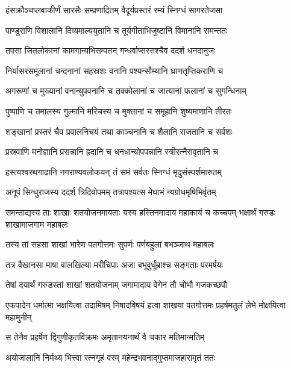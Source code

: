 \twolineshloka
{हंसक्रौञ्चप्लवाकीर्णं सारसैः सम्प्रणादितम्}
{वैदूर्यप्रस्तरं रम्यं स्निग्धं सागरतेजसा} %

\twolineshloka
{पाण्डुराणि विशालानि दिव्यमाल्ययुतानि च}
{तूर्यगीताभिजुष्टानि विमानानि समन्ततः} %

\twolineshloka
{तपसा जितलोकानां कामगान्यभिसम्पतन्}
{गन्धर्वाप्सरसश्चैव ददर्श धनदानुजः} %

\twolineshloka
{निर्यासरसमूलानां चन्दनानां सहस्रशः}
{वनानि पश्यन्सौम्यानि घ्राणतृप्तिकराणि च} %

\twolineshloka
{अगरूणां च मुख्यानां वनान्युपवनानि च}
{तक्कोलानां च जात्यानां फलानां च सुगन्धिनाम्} %

\twolineshloka
{पुष्पाणि च तमालस्य गुल्मानि मरिचस्य च}
{मुक्तानां च समूहानि शुष्यमाणानि तीरतः} %

\twolineshloka
{शङ्खानां प्रस्तरं चैव प्रवालनिचयं तथा}
{काञ्चनानि च शैलानि राजतानि च सर्वशः} %

\twolineshloka
{प्रस्रवाणि मनोज्ञानि प्रसन्नानि ह्रदानि च}
{धनधान्योपपन्नानि स्त्रीरत्नैरावृतानि च} %

\twolineshloka
{हस्त्यश्वरथगाढानि नगराण्यवलोकयन्}
{तं समं सर्वतः स्निग्धं मृदुसंस्पर्शमारुतम्} %

\twolineshloka
{अनूपं सिन्धुराजस्य ददर्श त्रिदिवोपमम्}
{तत्रापश्यत्स मेघाभं न्यग्रोधमृषिभिर्वृतम्} %

\threelineshloka
{समन्ताद्यस्य ताः शाखाः शतयोजनमायताः}
{यस्य हस्तिनमादाय महाकायं च कच्चपम्}
{भक्षार्थं गरुडः शाखामाजगाम महाबलः} %

\twolineshloka
{तस्य तां सहसा शाखां भारेण पतगोत्तमः}
{सुपर्णः पर्णबहुलां बभञ्जाथ महाबलः} %

\twolineshloka
{तत्र वैखानसा माषा वालखिल्या मरीचिपाः}
{अजा बभूवुर्धूम्राश्च सङ्गताः परमर्षयः} %

\twolineshloka
{तेषां दयार्थं गरुडस्तां शाखां शतयोजनाम्}
{जगामादाय वेगेन तौ चोभौ गजकच्छपौ} %

\threelineshloka
{एकपादेन धर्मात्मा भक्षयित्वा तदामिषम्}
{निषादविषयं हत्वा शाखया पतगोत्तमः}
{प्रहर्षमतुलं लेभे मोक्षयित्वा महामुनीन्} %

\twolineshloka
{स तेनैव प्रहर्षेण द्विगुणीकृतविक्रमः}
{अमृतानयनार्थं वै चकार मतिमान्मतिम्} %

\twolineshloka
{अयोजालानि निर्मथ्य भित्त्वा रत्नगृहं वरम्}
{महेन्द्रभवनाद्गुप्तमाजहारामृतं ततः} %

